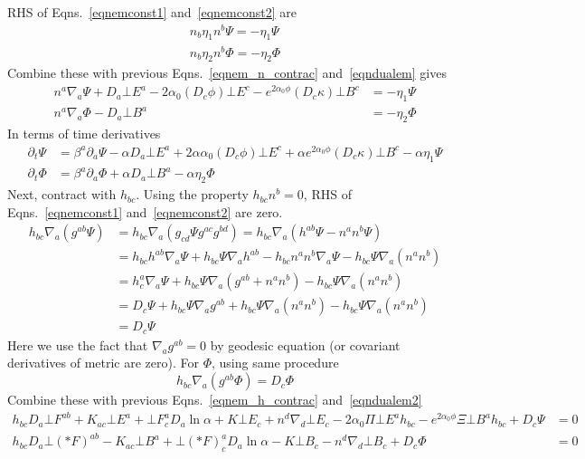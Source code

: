 \documentclass[prd]{revtex4}
\begin{document}
RHS of Eqns.~\ref{eqnemconst1} and~\ref{eqnemconst2} are
\begin{align}
n_b \eta_1 n^b \Psi = -\eta_1 \Psi \\
n_b \eta_2 n^b \Phi = -\eta_2 \Phi
\end{align}
Combine these with previous Eqns.~\ref{eqnem_n_contrac} and~\ref{eqndualem} gives
\begin{align}
n^a \nabla_a \Psi+ D_a \bot E^a - 2\alpha_0 (D_c \phi) \bot E^c -e^{2 \alpha_0 \phi} (D_c \kappa) \bot B^c &= -\eta_1 \Psi \\
n^a \nabla_a \Phi - D_a \bot B^a &= -\eta_2 \Phi
\end{align}
In terms of time derivatives
\begin{align}
\partial_t \Psi &= \beta^a \partial_a \Psi - \alpha D_a \bot E^a + 2 \alpha  \alpha_0 (D_c \phi) \bot E^c + \alpha  e^{2 \alpha_0 \phi} (D_c \kappa) \bot B^c  - \alpha \eta_1 \Psi \\
\partial_t \Phi &=  \beta^a \partial_a \Phi +\alpha D_a \bot B^a  - \alpha  \eta_2 \Phi
\end{align}
Next, contract with $h_{bc}$. Using the property $h_{bc} n^b = 0$, RHS of Eqns.~\ref{eqnemconst1} and~\ref{eqnemconst2} are zero.
\begin{align}
h_{bc} \nabla_a (g^{ab} \Psi) &= h_{bc} \nabla_a (g_{cd} \Psi g^{ac} g^{bd}) = h_{bc} \nabla_a (h^{ab} \Psi - n^a n^b \Psi) \nonumber \\
					     &=h_{bc} h^{ab} \nabla_a \Psi + h_{bc} \Psi \nabla_a h^{ab} - h_{bc} n^a n^b \nabla_a \Psi - h_{bc} \Psi \nabla_a (n^a n^b) \nonumber \\
					     &=h_c^a \nabla_a \Psi + h_{bc} \Psi \nabla_a (g^{ab} + n^a n^b) - h_{bc} \Psi \nabla_a (n^a n^b) \nonumber \\
					     &= D_c \Psi + h_{bc} \Psi \nabla_a g^{ab} + h_{bc} \Psi \nabla_a (n^a n^b) - h_{bc} \Psi \nabla_a (n^a n^b) \nonumber \\
					     &= D_c \Psi
\end{align}
Here we use the fact that $\nabla_a g^{ab} = 0$ by geodesic equation (or covariant derivatives of metric are zero). For $\Phi$, using same procedure
\begin{equation}
h_{bc} \nabla_a (g^{ab} \Phi) = D_c \Phi
\end{equation}
Combine these with previous Eqns.~\ref{eqnem_h_contrac} and~\ref{eqndualem2}
\begin{align}
h_{bc} D_a \bot F^{ab}  + K_{ac} \bot E^a + \bot F_c^a D_a \ln \alpha + K \bot E_c + n^d \nabla_d \bot E_c -2 \alpha_0 \Pi \bot E^a h_{bc}- e^{2 \alpha_0 \phi} \Xi \bot B^a h_{bc} + D_c \Psi &= 0 \\
h_{bc} D_a \bot (\ast F)^{ab}  - K_{ac} \bot B^a + \bot (\ast F)_c^a D_a \ln \alpha - K \bot B_c - n^d \nabla_d \bot B_c + D_c \Phi &= 0
\end{align}
\end{document}
